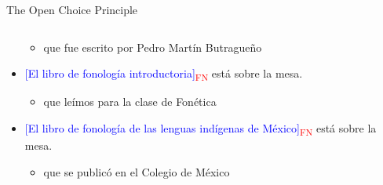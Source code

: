 \documentclass{beamer}
\begin{document}
\begin{frame}{The Open Choice Principle}
\begin{columns}
\begin{column}{6cm}
\begin{itemize}
\begin{itemize}
            \item que fue escrito por Pedro Martín Butragueño
        \end{itemize}
        \pause
        \item \textcolor{blue}{{[El libro de fonología introductoria]}}\textcolor{red}{\textsubscript{FN}} está sobre la mesa.
        \begin{itemize}
            \item que leímos para la clase de Fonética
        \end{itemize}
        \item \textcolor{blue}{{[El libro de fonología de las lenguas indígenas de México]}}\textcolor{red}{\textsubscript{FN}} está sobre la mesa.
        \begin{itemize}
            \item que se publicó en el Colegio de México
        \end{itemize}
        \end{itemize}
        \end{column}
    \end{columns}
\end{frame}
\end{document}

